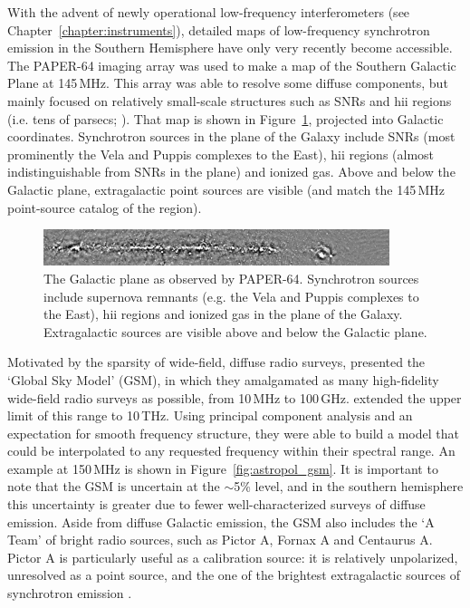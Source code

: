With the advent of newly operational low-frequency interferometers (see Chapter~\ref{chapter:instruments}), detailed maps of low-frequency synchrotron emission in the Southern Hemisphere have only very recently become accessible. 
The PAPER-64 imaging array \citep[][and Chapter~\ref{chapter:instruments}]{Jacobs.11, Jacobs.13, Stefan.13} was used to make a map of the Southern Galactic Plane at 145\,MHz. This array was able to resolve some diffuse components, but mainly focused on relatively small-scale structures such as SNRs and {\sc hii} regions (i.e. tens of parsecs; \citealt{Asvarov.13}). That map is shown in Figure~\ref{fig:astropol_galplane_paper}, projected into Galactic coordinates. Synchrotron sources in the plane of the Galaxy include SNRs (most prominently the Vela and Puppis complexes to the East), {\sc hii} regions (almost indistinguishable from SNRs in the plane) and ionized gas. Above and below the Galactic plane, extragalactic point sources are visible (and match the \cite{Jacobs.11} 145\,MHz point-source catalog of the region).

\begin{figure}
\centering
\includegraphics[width=0.9\textwidth]{chapters/astropol/figures/galplane_linscale.png}
\caption[The Southern Galactic Plane as observed by PAPER-64 at 145\,MHz.]{The Galactic plane as observed by PAPER-64. Synchrotron sources include supernova remnants (e.g. the Vela and Puppis complexes to the East), {\sc hii} regions and ionized gas in the plane of the Galaxy. Extragalactic sources are visible above and below the Galactic plane.}
\label{fig:astropol_galplane_paper}
\end{figure}
Motivated by the sparsity of wide-field, diffuse radio surveys, \cite{GSM.08} presented the `Global Sky Model' (GSM), in which they amalgamated as many high-fidelity wide-field radio surveys as possible, from 10\,MHz to 100\,GHz. \cite{GSM.17} extended the upper limit of this range to 10\,THz. Using principal component analysis and an expectation for smooth frequency structure, they were able to build a model that could be interpolated to any requested frequency within their spectral range. An example at 150\,MHz is shown in Figure~\ref{fig:astropol_gsm}. It is important to note that the GSM is uncertain at the $\sim$5\% level, and in the southern hemisphere this uncertainty is greater due to fewer well-characterized surveys of diffuse emission. Aside from diffuse Galactic emission, the GSM also includes the `A Team' of bright radio sources, such as Pictor A, Fornax A and Centaurus A. Pictor A is particularly useful as a calibration source: it is relatively unpolarized, unresolved as a point source, and the one of the brightest extragalactic sources of synchrotron emission \citep{Jacobs.13}.

